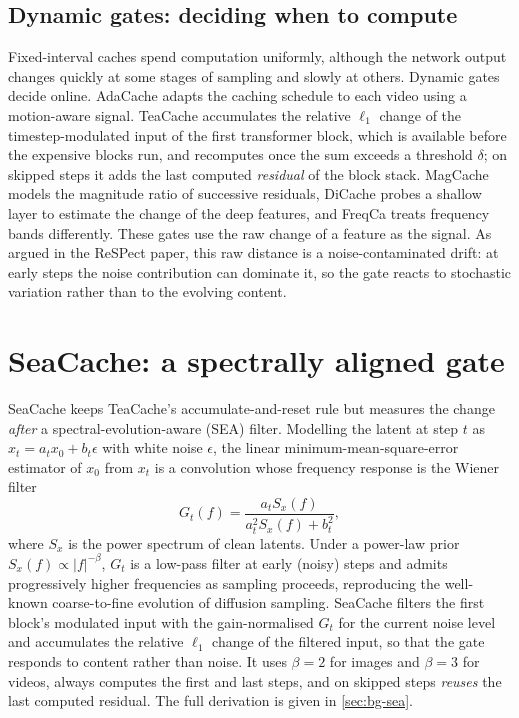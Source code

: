 \subsection{Dynamic gates: deciding when to compute}
Fixed-interval caches spend computation uniformly, although the network output changes quickly at some stages of sampling and slowly at others. Dynamic gates decide online. AdaCache \citep{kahatapitiya2025adacache} adapts the caching schedule to each video using a motion-aware signal. TeaCache \citep{liu2025teacache} accumulates the relative $\ell_1$ change of the timestep-modulated input of the first transformer block, which is available before the expensive blocks run, and recomputes once the sum exceeds a threshold $\delta$; on skipped steps it adds the last computed \emph{residual} of the block stack. MagCache \citep{ma2025magcache} models the magnitude ratio of successive residuals, DiCache \citep{bu2025dicache} probes a shallow layer to estimate the change of the deep features, and FreqCa \citep{liu2025freqca} treats frequency bands differently. These gates use the raw change of a feature as the signal. As argued in the ReSPect paper, this raw distance is a noise-contaminated drift: at early steps the noise contribution can dominate it, so the gate reacts to stochastic variation rather than to the evolving content.

\section{SeaCache: a spectrally aligned gate}\label{sec:lit-seacache}

SeaCache \citep{chung2026seacache} keeps TeaCache's accumulate-and-reset rule but measures the change \emph{after} a spectral-evolution-aware (SEA) filter. Modelling the latent at step $t$ as $x_t = a_t x_0 + b_t\epsilon$ with white noise $\epsilon$, the linear minimum-mean-square-error estimator of $x_0$ from $x_t$ is a convolution whose frequency response is the Wiener filter
\begin{equation}
  G_t(f) = \frac{a_t S_x(f)}{a_t^2 S_x(f) + b_t^2},
\end{equation}
where $S_x$ is the power spectrum of clean latents. Under a power-law prior $S_x(f)\propto |f|^{-\beta}$, $G_t$ is a low-pass filter at early (noisy) steps and admits progressively higher frequencies as sampling proceeds, reproducing the well-known coarse-to-fine evolution of diffusion sampling. SeaCache filters the first block's modulated input with the gain-normalised $G_t$ for the current noise level and accumulates the relative $\ell_1$ change of the filtered input, so that the gate responds to content rather than noise. It uses $\beta=2$ for images and $\beta=3$ for videos, always computes the first and last steps, and on skipped steps \emph{reuses} the last computed residual. The full derivation is given in \cref{sec:bg-sea}.

